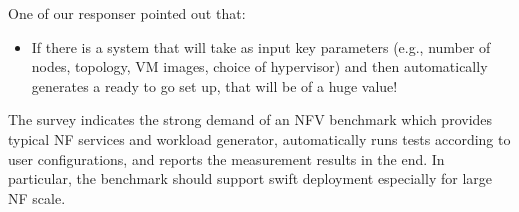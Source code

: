 One of our responser pointed out that:
\begin{itemize}
\item[]{}
If there is a system that will take as input key parameters (e.g., number of nodes, topology, VM images, choice of hypervisor) and then automatically generates a ready to go set up, that will be of a huge value!
\end{itemize}
The survey indicates the strong demand of an NFV benchmark
which provides typical NF services and workload generator,
automatically runs tests according to user configurations,
and reports the measurement results in the end.
In particular, the benchmark should support swift deployment 
especially for large NF scale.


